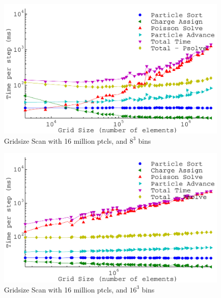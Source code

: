 



\begin{figure}
\begin{center}
\includegraphics[width=6in]{performance/gridsize_scan16ptcls8bins.pdf}
\end{center}
\caption{Gridsize Scan with 16 million ptcls, and $8^3$ bins}
\label{fig:grid_scan16ptcls8bins}
\end{figure}

\begin{figure}
\begin{center}
\includegraphics[width=6in]{performance/gridsize_scan16ptcls16bins.pdf}
\end{center}
\caption{Gridsize Scan with 16 million ptcls, and $16^3$ bins}
\label{fig:grid_scan16ptcls16bins}
\end{figure}

